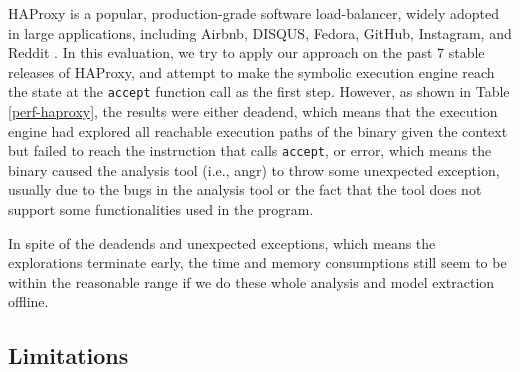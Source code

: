 HAProxy is a popular, production-grade software load-balancer, widely adopted in
large applications, including Airbnb, DISQUS, Fedora, GitHub, Instagram, and
Reddit \cite{haproxy-they-use-it}. In this evaluation, we try to apply our
approach on the past 7 stable releases of HAProxy, and attempt to make the
symbolic execution engine reach the state at the \texttt{accept} function call
as the first step. However, as shown in Table \ref{perf-haproxy}, the results
were either deadend, which means that the execution engine had explored all
reachable execution paths of the binary given the context but failed to reach
the instruction that calls \texttt{accept}, or error, which means the binary
caused the analysis tool (i.e., angr) to throw some unexpected exception,
usually due to the bugs in the analysis tool or the fact that the tool does not
support some functionalities used in the program.

In spite of the deadends and unexpected exceptions, which means the explorations
terminate early, the time and memory consumptions still seem to be within the
reasonable range if we do these whole analysis and model extraction offline.


\subsection{Limitations}


